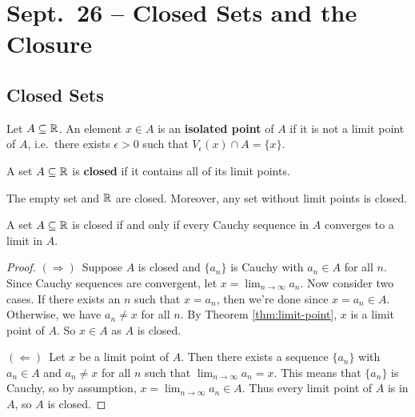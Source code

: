 \chapter{Sept.~26 -- Closed Sets and the Closure}

\section{Closed Sets}

\begin{definition}
  Let $A \subseteq \mathbb{R}$. An element $x \in A$ is
  an \textbf{isolated point} of $A$ if it is not
  a limit point of $A$, i.e.~there exists $\epsilon > 0$
  such that $V_\epsilon(x) \cap A = \{x\}$.
\end{definition}

\begin{definition}
  A set $A \subseteq \mathbb{R}$ is \textbf{closed}
  if it contains all of its limit points.
\end{definition}

\begin{example}
  The empty set and $\mathbb{R}$ are closed. Moreover, any
  set without limit points is closed.
\end{example}

\begin{theorem}
  A set $A \subseteq \mathbb{R}$ is closed if and only if
  every Cauchy sequence in $A$ converges to a
  limit in $A$.
\end{theorem}

\begin{proof}
  $(\Rightarrow)$\, Suppose $A$ is closed and
  $\{a_n\}$ is Cauchy with $a_n \in A$ for all $n$.
  Since Cauchy sequences are convergent, let
  $x = \lim_{n \to \infty} a_n$. Now consider two cases.
  If there exists an $n$ such that $x = a_n$, then we're
  done since $x = a_n \in A$. Otherwise, we have
  $a_n \ne x$ for all $n$. By Theorem \ref{thm:limit-point},
  $x$ is a limit point of $A$. So $x \in A$ as
  $A$ is closed.

  $(\Leftarrow)$\, Let $x$ be a limit point of $A$.
  Then there exists a sequence $\{a_n\}$ with $a_n \in A$
  and $a_n \ne x$ for all $n$ such that
  $\lim_{n \to \infty} a_n = x$. This means that
  $\{a_n\}$ is Cauchy, so by assumption,
  $x = \lim_{n \to \infty} a_n \in A$. Thus every limit
  point of $A$ is in $A$, so $A$ is closed.
\end{proof}

